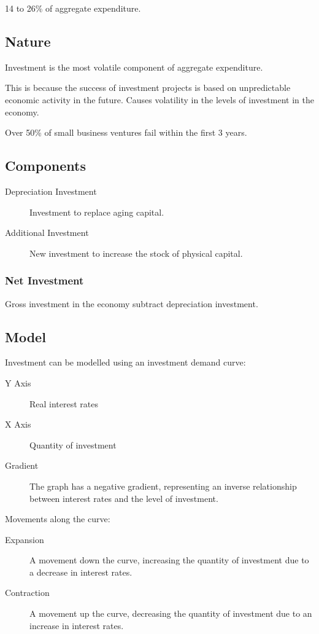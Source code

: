 \documentclass[a4paper,11pt]{article}
\begin{document}
14 to 26\% of aggregate expenditure.


\subsection{Nature}

Investment is the most volatile component of aggregate expenditure.

This is because the success of investment projects is based on unpredictable
economic activity in the future. Causes volatility in the levels of investment
in the economy.

Over 50\% of small business ventures fail within the first 3 years.


\subsection{Components}

\begin{description}
\item [Depreciation Investment] Investment to replace aging capital.
\item [Additional Investment] New investment to increase the stock of physical
	capital.
\end{description}


\subsubsection{Net Investment}

Gross investment in the economy subtract depreciation investment.


\subsection{Model}

Investment can be modelled using an investment demand curve:

\begin{description}
\item [Y Axis] Real interest rates
\item [X Axis] Quantity of investment
\item [Gradient] The graph has a negative gradient, representing an inverse
	relationship between interest rates and the level of investment.
\end{description}

Movements along the curve:

\begin{description}
\item [Expansion] A movement down the curve, increasing the quantity of
	investment due to a decrease in interest rates.
\item [Contraction] A movement up the curve, decreasing the quantity of
	investment due to an increase in interest rates.
\end{description}
\end{document}
